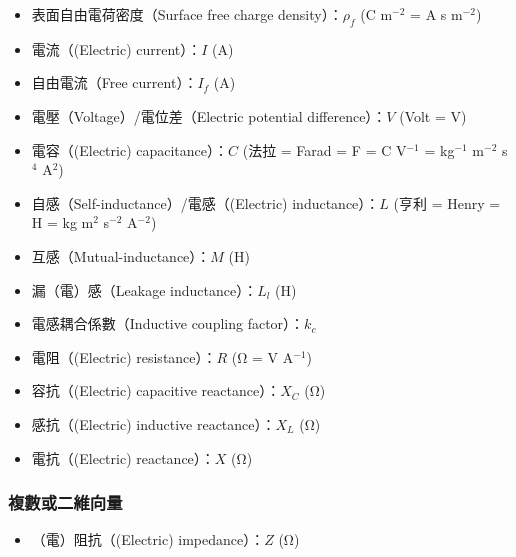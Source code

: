 \documentclass[a4paper,12pt]{report}
\begin{document}
\begin{itemize}
\begin{itemize}
\item 表面自由電荷密度（Surface free charge density）：$\rho_f$ (C m$^{-2}$ = A s m$^{-2}$)
\item 電流（(Electric) current）：$I$ (A)
\item 自由電流（Free current）：$I_f$ (A)
\item 電壓（Voltage）/電位差（Electric potential difference）：$V$ (Volt = V)
\item 電容（(Electric) capacitance）：$C$ (法拉 = Farad = F = C V$^{-1}$ = kg$^{-1}$ m$^{-2}$ s$^4$ A$^2$)
\item 自感（Self-inductance）/電感（(Electric) inductance）：$L$ (亨利 = Henry = H = kg m$^2$ s$^{-2}$ A$^{-2}$)
\item 互感（Mutual-inductance）：$M$ (H)
\item 漏（電）感（Leakage inductance）：$L_l$ (H)
\item 電感耦合係數（Inductive coupling factor）：$k_c$
\item 電阻（(Electric) resistance）：$R$ (Ω = V A$^{-1}$)
\item 容抗（(Electric) capacitive reactance）：$X_C$ (Ω)
\item 感抗（(Electric) inductive reactance）：$X_L$ (Ω)
\item 電抗（(Electric) reactance）：$X$ (Ω)
\end{itemize}
\subsubsection{複數或二維向量}
\begin{itemize}
\item （電）阻抗（(Electric) impedance）：$Z$ (Ω)
\end{itemize}

\end{itemize}
\end{document}
